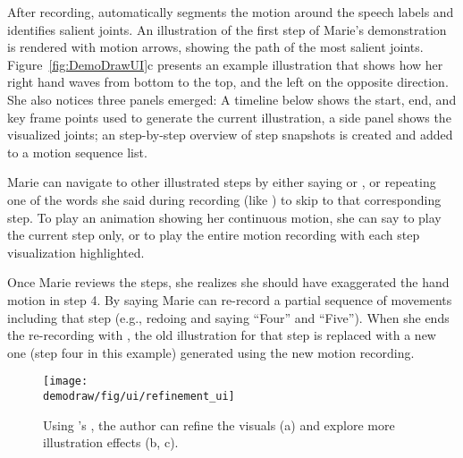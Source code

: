 After recording, \systemname{} automatically segments the motion around the speech labels and identifies salient joints. An illustration of the first step of Marie's demonstration is rendered with motion arrows, showing the path of the most salient joints. Figure~\ref{fig:DemoDrawUI}c presents an example illustration that shows how her right hand waves from bottom to the top, and the left on the opposite direction. She also notices three panels emerged: A timeline below shows the start, end, and key frame points used to generate the current illustration, a side panel shows the visualized joints; an step-by-step overview of step snapshots is created and added to a motion sequence list.

\clearpage

Marie can navigate to other illustrated steps by either saying  or , or repeating one of the words she said during recording (like ) to skip to that corresponding step. To play an animation showing her continuous motion, she can say  to play the current step only, or  to play the entire motion recording with each step visualization highlighted.

Once Marie reviews the steps, she realizes she should have exaggerated the hand motion in step 4. By saying  Marie can re-record a partial sequence of movements including that step (e.g., redoing and saying ``Four'' and ``Five'').
When she ends the re-recording with , the old illustration for that step is replaced with a new one (step four in this example) generated using the new motion recording.

\begin{figure*}[t!]
  \centering
  \texttt{[image: \\demodraw/fig/ui/refinement\_ui]}
  \caption{Using \systemname{}'s \phaseII{}, the author can refine the visuals (a) and explore more illustration effects (b, c).}
  \label{fig:DemoDrawRefinementUI}
\end{figure*}

